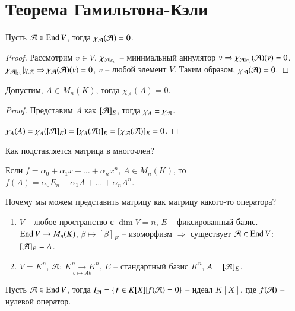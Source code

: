 \documentclass[main]{subfiles}
\begin{document}
\chapter{Теорема Гамильтона-Кэли}

\begin{theorem}
    Пусть $\mathcal{A} \in \operatorname{End} V$, тогда $\chi_{\mathcal{A}}(\mathcal{A}) = 0$.
\end{theorem}

\begin{proof}
    Рассмотрим $v \in V$.  $\chi_{\mathcal{A} |_{C_v}}$ -- минимальный аннулятор $v \Rightarrow \chi_{\mathcal{A} |_{C_v}}(\mathcal{A})(v) = 0$.
    $\chi_{\mathcal{A} |_{C_v}} | \chi_{\mathcal{A}} \Rightarrow \chi_{\mathcal{A}} (\mathcal{A})(v) = 0$,
    $v$ -- любой элемент $V$. Таким образом, $\chi_{\mathcal{A}}(\mathcal{A}) = 0$.
\end{proof}

\begin{corollary} 
    Допустим, $A \in M_n(K)$, тогда $\chi_A(A)=0$.
\end{corollary}

\begin{proof}
    Представим $A$ как $[\mathcal{A}]_E$, тогда $\chi_A = \chi_{\mathcal{A}}$.

    $\chi_A (A) = \chi_A ([\mathcal{A}]_E) = [\chi_A(\mathcal{A})]_E =[\chi_{\mathcal{A}}(\mathcal{A})]_E = 0$.
\end{proof}

Как подставляется матрица в многочлен?

Если $f = \alpha_0 + \alpha_1 x + \ldots + \alpha_n x^n$, $A \in M_n(K)$, то
$f(A) = \alpha_0 E_n + \alpha_1 A + \ldots + \alpha_n A^n$.

Почему мы можем представить матрицу как матрицу какого-то оператора?
\begin{enumerate}
    \item $V$ -- любое пространство с $\dim V = n$, $E$ -- фиксированный базис.
          $\operatorname{End} V \rightarrow M_n(K)$, $\beta \mapsto [\beta]_E$ -- изоморфизм $\Rightarrow$ существует $\mathcal{A} \in \operatorname{End} V$: $[\mathcal{A}]_E = A$.

    \item $V = K^n$, $\mathcal{A}$: $\underset{b \mapsto Ab}{K^n \rightarrow K^n}$, $E$ -- стандартный базис $K^n$, $A = [\mathcal{A}]_E$.
\end{enumerate}

\begin{proposition}
    Пусть $\mathcal{A} \in \operatorname{End} V$, тогда $I_{\mathcal{A}} = \{f\in K[X] | f(\mathcal{A}) = 0\}$ -- идеал $K[X]$, где $f(\mathcal{A})$ -- нулевой оператор.
\end{proposition}
\end{document}
